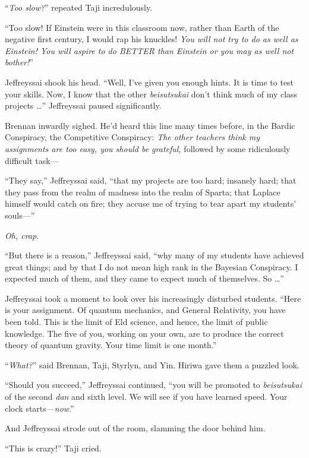 {
 ``\textit{Too slow?}'' repeated
Taji incredulously.}

{
 ``Too slow! If Einstein were in this classroom
now, rather than Earth of the negative first century, I would rap his
knuckles! \textit{You will not try to do as well as Einstein! You will
aspire to do BETTER than Einstein or you may as well not
bother!}''}

{
 Jeffreyssai shook his head. ``Well,
I've given you enough hints. It is time to test your
skills. Now, I know that the other \textit{beisutsukai}
don't think much of my class projects
\ldots'' Jeffreyssai paused significantly.}

{
 Brennan inwardly sighed. He'd heard this line many
times before, in the Bardic Conspiracy, the Competitive Conspiracy:
\textit{The other teachers think my assignments are too easy, you
should be grateful,} followed by some ridiculously difficult task---}

{
 ``They say,'' Jeffreyssai said,
``that my projects are too hard; insanely hard; that
they pass from the realm of madness into the realm of Sparta; that
Laplace himself would catch on fire; they accuse me of trying to tear
apart my students' souls---''}

{
 \textit{Oh, crap.}}

{
 ``But there is a reason,''
Jeffreyssai said, ``why many of my students have
achieved great things; and by that I do not mean high rank in the
Bayesian Conspiracy. I expected much of them, and they came to expect
much of themselves. So \ldots''}

{
 Jeffreyssai took a moment to look over his increasingly disturbed
students. ``Here is your assignment. Of quantum
mechanics, and General Relativity, you have been told. This is the
limit of Eld science, and hence, the limit of public knowledge. The
five of you, working on your own, are to produce the correct theory of
quantum gravity. Your time limit is one month.''}

{
 ``\textit{What?}'' said
Brennan, Taji, Styrlyn, and Yin. Hiriwa gave them a puzzled look.}

{
 ``Should you succeed,''
Jeffreyssai continued, ``you will be promoted to
\textit{beisutsukai} of the second \textit{dan} and sixth level. We
will see if you have learned speed. Your clock
starts---\textit{now}.''}

{
 And Jeffreyssai strode out of the room, slamming the door behind
him.}

{
 ``This is crazy!'' Taji cried.}

